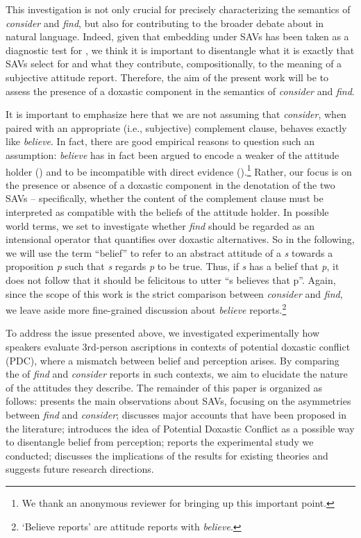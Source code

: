 \documentclass[output=paper,colorlinks,citecolor=brown]{langscibook}
\begin{document}
This investigation is not only crucial for precisely characterizing the semantics of \textit{consider} and \textit{find}, but also for contributing to the broader debate about  in natural language. Indeed, given that embedding under SAVs has been taken as a diagnostic test for , we think it is important to disentangle what it is exactly that SAVs select for and what they contribute, compositionally, to the meaning of a subjective attitude report. Therefore, the aim of the present work will be to assess the presence of a doxastic component in the semantics of \textit{consider} and \textit{find}.

It is important to emphasize here that we are not assuming that \textit{consider}, when paired with an appropriate (i.e., subjective) complement clause, behaves exactly like \textit{believe}. In fact, there are good empirical reasons to question such an assumption: \textit{believe} has in fact been argued to encode a weaker  of the attitude holder (\citealt{koev2019strong}) and to be incompatible with direct evidence (\citealt{charlow2021experiential}).\footnote{We thank an anonymous reviewer for bringing up this important point.} Rather, our focus is on the presence or absence of a doxastic component in the denotation of the two SAVs -- specifically, whether the content of the complement clause must be interpreted as compatible with the beliefs of the attitude holder. In possible world terms, we set to investigate whether \textit{find} should be regarded as an intensional operator that quantifies over doxastic alternatives. So in the following, we will use the term ``belief'' to refer to an abstract attitude of a  \textit{s} towards a proposition \textit{p} such that \textit{s} regards \textit{p} to be true. Thus, if \textit{s} has a belief that \textit{p}, it does not follow that it should be felicitous to utter ``s believes that p''. Again, since the scope of this work is the strict comparison between \textit{consider} and \textit{find}, we leave aside more fine-grained discussion about \textit{believe} reports.\footnote{`Believe reports' are attitude reports with \emph{believe}.}

To address the issue presented above, we investigated experimentally how speakers evaluate 3rd-person  ascriptions in contexts of potential doxastic conflict (PDC), where a mismatch between belief and perception arises. By comparing the  of \textit{find} and \textit{consider} reports in such contexts, we aim to elucidate the nature of the attitudes they describe. 
The remainder of this paper is organized as follows:  presents the main observations about SAVs, focusing on the asymmetries between \textit{find} and \textit{consider};   discusses major accounts that have been proposed in the literature;   introduces the idea of Potential Doxastic Conflict as a possible way to disentangle belief from perception;  reports the experimental study we conducted;  discusses the implications of the results for existing theories and suggests future research directions.
\end{document}
